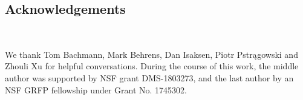 










\subsection*{Acknowledgements}\

We thank
Tom Bachmann,
Mark Behrens,
Dan Isaksen,
Piotr Pstr\k{a}gowski and
Zhouli Xu
for helpful conversations.
During the course of this work, the middle author was supported by NSF grant DMS-1803273,
and the last author by an NSF GRFP fellowship under Grant No. 1745302.
